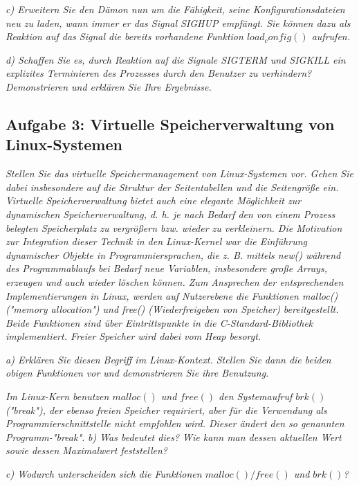 \documentclass[a4paper]{article}
\begin{document}
\textit{c) Erweitern Sie den Dämon nun um die Fähigkeit, seine Konfigurationsdateien neu zu laden, wann immer er das Signal SIGHUP empfängt. Sie können dazu als Reaktion auf das Signal die bereits vorhandene Funktion $load_config()$ aufrufen.}
\vspace{10mm}

\textit{d) Schaffen Sie es, durch Reaktion auf die Signale SIGTERM und SIGKILL ein explizites Terminieren des Prozesses durch den Benutzer zu verhindern? Demonstrieren und erklären Sie Ihre Ergebnisse.}
\vspace{10mm}


\subsection{Aufgabe 3: Virtuelle Speicherverwaltung von Linux-Systemen}
\textit{Stellen Sie das virtuelle Speichermanagement von Linux-Systemen vor. Gehen Sie dabei insbesondere auf die Struktur der Seitentabellen und die Seitengröße ein.
    Virtuelle Speicherverwaltung bietet auch eine elegante Möglichkeit zur dynamischen Speicherverwaltung, d. h. je nach Bedarf den von einem Prozess belegten Speicherplatz zu vergrößern bzw. wieder zu verkleinern.
    Die Motivation zur Integration dieser Technik in den Linux-Kernel war die Einführung dynamischer Objekte in Programmiersprachen, die z. B. mittels new() während des Programmablaufs bei Bedarf neue Variablen, insbesondere große Arrays, erzeugen und auch wieder löschen können. Zum Ansprechen der entsprechenden Implementierungen in Linux, werden auf Nutzerebene die Funktionen malloc() ("memory allocation") und free() (Wiederfreigeben von Speicher) bereitgestellt. Beide Funktionen sind über Eintrittspunkte in die C-Standard-Bibliothek implementiert. Freier Speicher wird dabei vom Heap besorgt.}
\vspace{10mm}

\textit{a) Erklären Sie diesen Begriff im Linux-Kontext. Stellen Sie dann die beiden obigen Funktionen vor und demonstrieren Sie ihre Benutzung.}
\vspace{10mm}

\textit{Im Linux-Kern benutzen $malloc()$ und $free()$ den Systemaufruf $brk()$ ("break"), der ebenso freien Speicher requiriert, aber für die Verwendung als Programmierschnittstelle nicht empfohlen wird. Dieser ändert den so genannten Programm-"break".}
\vspace{10mm}
\textit{b) Was bedeutet dies? Wie kann man dessen aktuellen Wert sowie dessen Maximalwert feststellen?}
\vspace{10mm}

\textit{c) Wodurch unterscheiden sich die Funktionen $malloc()/free()$ und $brk()$?}
\vspace{10mm}
\end{document}
